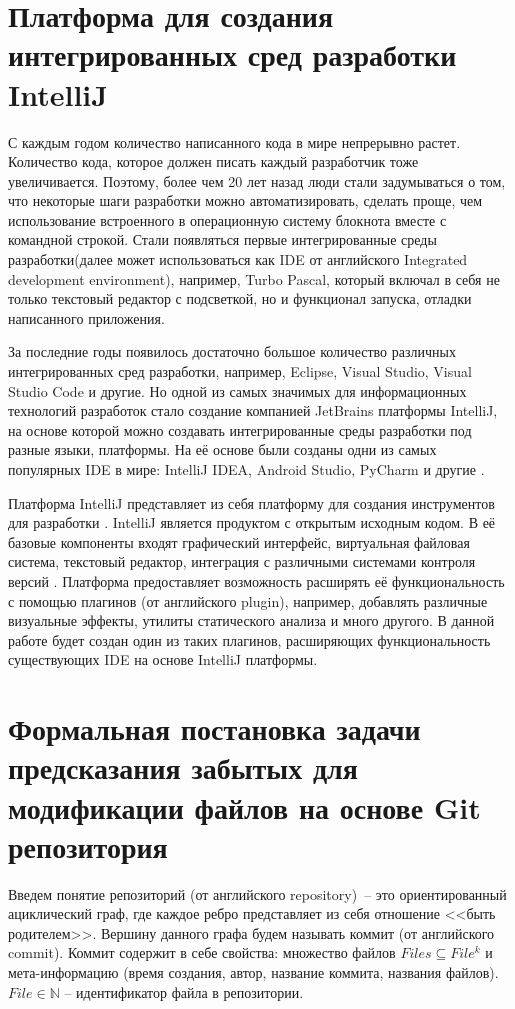 \section{Платформа для создания интегрированных сред разработки IntelliJ}
С каждым годом количество написанного кода в мире непрерывно растет. Количество кода, которое должен писать каждый разработчик тоже увеличивается. Поэтому, более чем 20 лет назад люди стали задумываться о том, что некоторые шаги разработки можно автоматизировать, сделать проще, чем использование встроенного в операционную систему блокнота вместе с командной строкой. Стали появляться первые интегрированные среды разработки(далее может использоваться как IDE от английского Integrated development environment), например, Turbo Pascal, который включал в себя не только текстовый редактор с подсветкой, но и функционал запуска, отладки написанного приложения.

За последние годы появилось достаточно большое количество различных интегрированных сред разработки, например, Eclipse, Visual Studio, Visual Studio Code и другие. Но одной из самых значимых для информационных технологий разработок стало создание компанией JetBrains платформы IntelliJ, на основе которой можно создавать интегрированные среды разработки под разные языки, платформы. На её основе были созданы одни из самых популярных IDE в мире: IntelliJ IDEA, Android Studio, PyCharm и другие \cite{top-ide}.

Платформа IntelliJ представляет из себя платформу для создания инструментов для разработки \cite{intellij-top}. IntelliJ является продуктом с открытым исходным кодом. В её базовые компоненты входят графический интерфейс, виртуальная файловая система, текстовый редактор, интеграция с различными системами контроля версий \cite{intellij-top}. Платформа предоставляет возможность расширять её функциональность с помощью плагинов (от английского plugin), например, добавлять различные визуальные эффекты, утилиты статического анализа и много другого. В данной работе будет создан один из таких плагинов, расширяющих функциональность существующих IDE на основе IntelliJ платформы.


\section{Формальная постановка задачи предсказания забытых для модификации файлов на основе Git репозитория}
Введем понятие репозиторий (от английского repository)~-- это ориентированный ациклический граф, где каждое ребро представляет из себя отношение <<быть родителем>>. Вершину данного графа будем называть коммит (от английского commit). Коммит содержит в себе свойства: множество файлов $Files \subseteq File^k$ и мета-информацию (время создания, автор, название коммита, названия файлов). $File \in \mathbb{N}$ -- идентификатор файла в репозитории.\\
